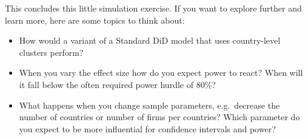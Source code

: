 \documentclass[
  letterpaper,
  DIV=11,
  numbers=noendperiod]{scrartcl}
\providecommand{\tightlist}{%
  \setlength{\itemsep}{0pt}\setlength{\parskip}{0pt}}\usepackage{longtable,booktabs,array}
\begin{document}
This concludes this little simulation exercise. If you want to explore
further and learn more, here are some topics to think about:

\begin{itemize}
\tightlist
\item
  How would a variant of a Standard DiD model that uses country-level
  clusters perform?
\item
  When you vary the effect size how do you expect power to react? When
  will it fall below the often required power hurdle of 80\%?
\item
  What happens when you change sample parameters, e.g.~decrease the
  number of countries or number of firms per countries? Which parameter
  do you expect to be more influential for confidence intervals and
  power?
\end{itemize}
\end{document}
